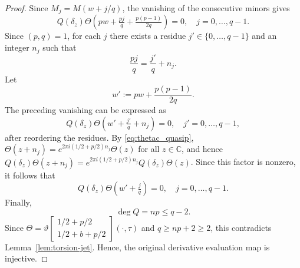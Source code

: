 \documentclass[10pt,a4paper]{amsart}
\newcommand{\C}{\mathbb C}
\newcommand{\dd}{\delta}
\newcommand{\thetac}[2]{{\vartheta\left[\begin{smallmatrix}
        #1 \\ #2
    \end{smallmatrix}\right]}}
\theoremstyle{plain}
\begin{document}
\begin{proof}
Since $M_j=M(w+j/q)$, the vanishing of the consecutive minors gives
$$
Q(\dd_z)\Theta\left(
pw+\tfrac{pj}{q}+\tfrac{p(p-1)}{2q}
\right)=0,
\quad j=0,\dots,q-1.
$$
Since $(p,q)=1$, for each $j$ there exists a residue $j'\in\{0,\dots,q-1\}$
and an integer $n_j$ such that
$$
\frac{pj}{q}=\frac{j'}{q}+n_j.
$$
Let
$$
w':=pw+\frac{p(p-1)}{2q}.
$$
The preceding vanishing can be expressed as
$$
Q(\dd_z) \Theta\left(w'+\tfrac{j'}{q}+n_j\right)=0,
\quad j'=0,\dots,q-1,
$$
after reordering the residues. 
By \eqref{eq:thetac_quasip}, $\Theta(z+n_j)=e^{2\pi i(1/2+p/2)n_j}\Theta(z)$ for all $z\in\C$, and hence $Q(\dd_z)\Theta(z+n_j)=e^{2\pi i(1/2+p/2)n_j}Q(\dd_z)\Theta(z)$. Since this factor is nonzero, it follows that
$$
Q(\dd_z)\Theta\left(w'+\tfrac{j}{q}\right)=0,
\quad j=0,\dots,q-1.
$$
Finally,
$$
\deg Q={{n}}p\leq q-2.
$$
Since $\Theta=\thetac{1/2+p/2}{1/2+b+p/2}(\cdot,\tau)$ and $q\geq np+2\geq 2$, this contradicts Lemma~\ref{lem:torsion-jet}. Hence, the original derivative evaluation map is injective.
\end{proof}
\end{document}
